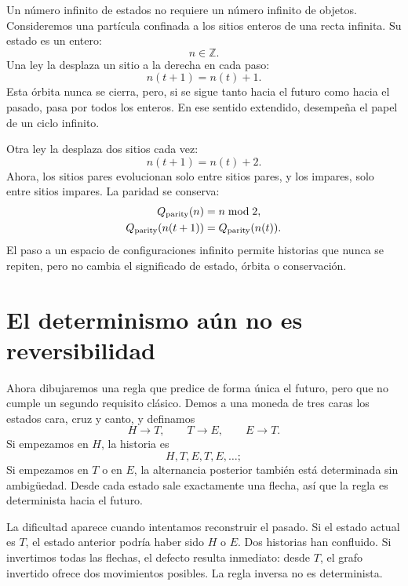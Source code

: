 Un número infinito de estados no requiere un número infinito de objetos.
Consideremos una partícula confinada a los sitios enteros de una recta infinita.
Su estado es un entero:
\[
  n\in\mathbb Z.
\]
Una ley la desplaza un sitio a la derecha en cada paso:
\begin{equation}
  n(t+1)=n(t)+1.
  \label{eq:lattice-one}
\end{equation}
Esta órbita nunca se cierra, pero, si se sigue tanto hacia el futuro como hacia
el pasado, pasa por todos los enteros. En ese sentido extendido, desempeña el
papel de un ciclo infinito.

Otra ley la desplaza dos sitios cada vez:
\begin{equation}
  n(t+1)=n(t)+2.
  \label{eq:lattice-two}
\end{equation}
Ahora, los sitios pares evolucionan solo entre sitios pares, y los impares, solo
entre sitios impares. La paridad se conserva:
\begin{equation}
  \begin{aligned}
    Q_{\rm parity}(n)&=n\bmod 2,\\
    Q_{\rm parity}(n(t+1))&=Q_{\rm parity}(n(t)).
  \end{aligned}
\end{equation}
El paso a un espacio de configuraciones infinito permite historias que nunca se
repiten, pero no cambia el significado de estado, órbita o conservación.

\section{El determinismo aún no es reversibilidad}

Ahora dibujaremos una regla que predice de forma única el futuro, pero que no
cumple un segundo requisito clásico. Demos a una moneda de tres caras los estados
cara, cruz y canto, y definamos
\begin{equation}
  H\to T,
  \qquad
  T\to E,
  \qquad
  E\to T.
  \label{eq:nonreversible-map}
\end{equation}
Si empezamos en \(H\), la historia es
\[
  H,T,E,T,E,\ldots;
\]
Si empezamos en \(T\) o en \(E\), la alternancia posterior también está
determinada sin ambigüedad. Desde cada estado sale exactamente una flecha, así que
la regla es determinista hacia el futuro.

La dificultad aparece cuando intentamos reconstruir el pasado. Si el estado
actual es \(T\), el estado anterior podría haber sido \(H\) o \(E\). Dos
historias han confluido. Si invertimos todas las flechas, el defecto resulta
inmediato: desde \(T\), el grafo invertido ofrece dos movimientos posibles. La
regla inversa no es determinista.

